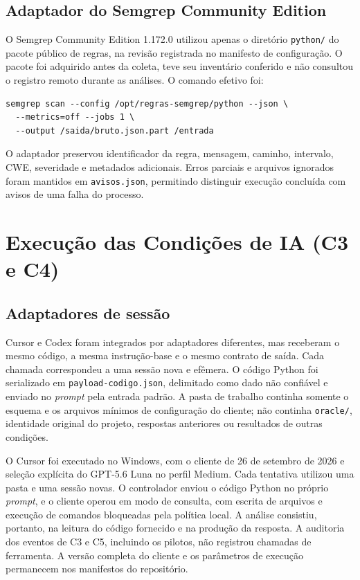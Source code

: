 \subsection{Adaptador do Semgrep Community Edition}\label{subsec:execucao-semgrep}

O Semgrep Community Edition 1.172.0 utilizou apenas o diretório \texttt{python/} do pacote público de regras, na revisão registrada no manifesto de configuração. O pacote foi adquirido antes da coleta, teve seu inventário conferido e não consultou o registro remoto durante as análises. O comando efetivo foi:

\begin{verbatim}
semgrep scan --config /opt/regras-semgrep/python --json \
  --metrics=off --jobs 1 \
  --output /saida/bruto.json.part /entrada
\end{verbatim}

O adaptador preservou identificador da regra, mensagem, caminho, intervalo, CWE, severidade e metadados adicionais. Erros parciais e arquivos ignorados foram mantidos em \texttt{avisos.json}, permitindo distinguir execução concluída com avisos de uma falha do processo.

\section{Execução das Condições de IA (C3 e C4)}\label{sec:execucao-ia-desenvolvimento}

\subsection{Adaptadores de sessão}\label{subsec:adaptadores-sessao-ia}

Cursor e Codex foram integrados por adaptadores diferentes, mas receberam o mesmo código, a mesma instrução-base e o mesmo contrato de saída. Cada chamada correspondeu a uma sessão nova e efêmera. O código Python foi serializado em \texttt{payload-codigo.json}, delimitado como dado não confiável e enviado no \textit{prompt} pela entrada padrão. A pasta de trabalho continha somente o esquema e os arquivos mínimos de configuração do cliente; não continha \texttt{oracle/}, identidade original do projeto, respostas anteriores ou resultados de outras condições.

O Cursor foi executado no Windows, com o cliente de 26 de setembro de 2026 e seleção explícita do GPT-5.6 Luna no perfil Medium. Cada tentativa utilizou uma pasta e uma sessão novas. O controlador enviou o código Python no próprio \textit{prompt}, e o cliente operou em modo de consulta, com escrita de arquivos e execução de comandos bloqueadas pela política local. A análise consistiu, portanto, na leitura do código fornecido e na produção da resposta. A auditoria dos eventos de C3 e C5, incluindo os pilotos, não registrou chamadas de ferramenta. A versão completa do cliente e os parâmetros de execução permanecem nos manifestos do repositório.

